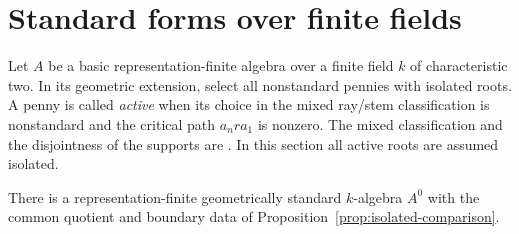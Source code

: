 \section{Standard forms over finite fields}\label{sec:standardization}
Let $A$ be a basic representation-finite algebra over a finite field $k$ of characteristic two. In its geometric extension, select all nonstandard pennies with isolated roots. A penny is called \emph{active} when its choice in the mixed ray/stem classification is nonstandard and the critical path $a_nra_1$ is nonzero. The mixed classification and the disjointness of the supports are \cite[Theorems 6 and 10]{Bongartz13}. In this section all active roots are assumed isolated.

\begin{proposition}\label{prop:actual-standardization}
There is a representation-finite geometrically standard $k$-algebra $A^0$ with the common quotient and boundary data of Proposition~\ref{prop:isolated-comparison}.
\end{proposition}
